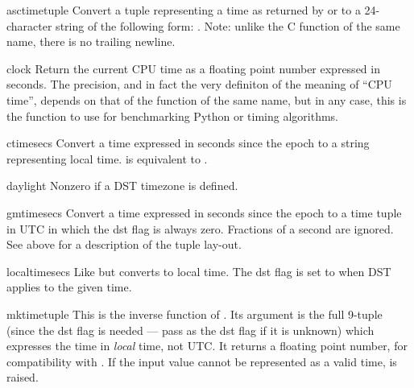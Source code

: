 \begin{funcdesc}{asctime}{tuple}
Convert a tuple representing a time as returned by  or
 to a 24-character string of the following form:
.  Note: unlike the C function of
the same name, there is no trailing newline.
\end{funcdesc}

\begin{funcdesc}{clock}{}
Return the current CPU time as a floating point number expressed in
seconds.  The precision, and in fact the very definiton of the meaning
of ``CPU time'', depends on that of the \C{} function
of the same name, but in any case, this is the function to use for
benchmarking Python or timing algorithms.
\end{funcdesc}

\begin{funcdesc}{ctime}{secs}
Convert a time expressed in seconds since the epoch to a string
representing local time.   is equivalent to
.
\end{funcdesc}

\begin{datadesc}{daylight}
Nonzero if a DST timezone is defined.
\end{datadesc}

\begin{funcdesc}{gmtime}{secs}
Convert a time expressed in seconds since the epoch to a time tuple
in UTC in which the dst flag is always zero.  Fractions of a second are
ignored.  See above for a description of the tuple lay-out.
\end{funcdesc}

\begin{funcdesc}{localtime}{secs}
Like  but converts to local time.  The dst flag is
set to  when DST applies to the given time.
\end{funcdesc}

\begin{funcdesc}{mktime}{tuple}
This is the inverse function of .  Its argument is the
full 9-tuple (since the dst flag is needed --- pass  as the
dst flag if it is unknown) which expresses the time
in \emph{local} time, not UTC.  It returns a floating
point number, for compatibility with .  If the input
value cannot be represented as a valid time, 
is raised.
\end{funcdesc}

